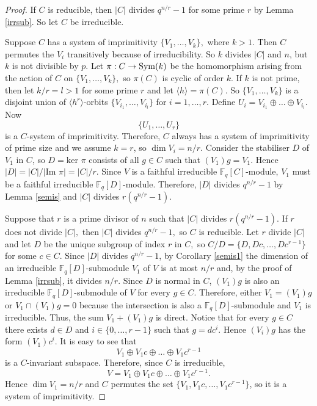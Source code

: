 \begin{proof}
If $C$ is reducible, then $|C|$ divides $q^{n/r}-1$ for some prime $r$ by Lemma \ref{irrsub}. So let $C$ be irreducible.

Suppose $C$ has a system of imprimitivity $\{V_1, \ldots, V_k\},$ where $k>1.$ Then $C$ permutes the $V_i$ transitively because of irreducibility. So $k$ divides $|C|$ and $n$, but $k$ is not divisible by $p$. Let $\pi: C \to \mathrm{Sym}(k)$ be the homomorphism arising from the action of $C$ on  
$\{V_1, \ldots, V_k\},$ so $\pi(C)$ is cyclic of order $k.$ If $k$ is not prime, then let $k/r=l>1$ for some prime $r$ and let $\langle h \rangle=\pi(C).$ So $\{V_1, \ldots, V_k\}$ is a disjoint union of  $\langle h^r \rangle$-orbits $\{V_{i_1}, \ldots, V_{i_l}\}$ for $i=1, \ldots, r.$ Define $U_i=V_{i_1} \oplus \ldots \oplus V_{i_l}.$ Now
$$\{U_1, \ldots, U_r\}$$ is a $C$-system of imprimitivity. Therefore, $C$ always has a system of imprimitivity of prime size and we assume $k=r$, so $\dim V_i =n/r$. Consider the stabiliser $D$ of $V_1$ in $C$, so $D=\text{ker }\pi$  consists of all $g \in C$ such that $(V_1)g=V_1.$ Hence $|D|=|C|/|\text{Im }\pi|=|C|/r.$ Since $V$ is a faithful irreducible $\mathbb{F}_q[C]$-module, $V_1$ must be a faithful irreducible $\mathbb{F}_q[D]$-module. Therefore, $|D|$ divides $q^{n/r}-1$ by Lemma \ref{semis} and $|C|$ divides $r(q^{n/r}-1).$

Suppose  that  $r$ is a prime divisor of $n$ such that $|C|$ divides ${r(q^{n/r}-1)}.$ If $r$ does not divide $|C|,$ then $|C|$ divides $q^{n/r}-1,$ so $C$ is reducible. Let $r$ divide $|C|$ and let $D$ be the unique subgroup of index $r$ in $C,$ so $C/D=\{D,Dc, \ldots, Dc^{r-1}\}$ for some  $c \in C.$ Since $|D|$ divides $q^{n/r}-1$, by Corollary \ref{semis1} the dimension of an irreducible $\mathbb{F}_q[D]$-submodule $V_1$ of $V$ is at most $n/r$ and, by the proof of Lemma \ref{irrsub}, it divides $n/r.$
Since $D$ is normal in $C$, $(V_1)g$ is also an irreducible $\mathbb{F}_q[D]$-submodule of $V$ for every $g \in C$. Therefore, either $V_1=(V_1)g$ or $V_1 \cap (V_1)g=0$ because the intersection is also a $\mathbb{F}_q[D]$-submodule and $V_1$ is irreducible. Thus, the sum $V_1 + (V_1)g$ is direct. Notice that for every $g \in C$ there exists $d \in D$ and $i \in \{0, \ldots, r-1\}$ such that  $g = dc^i.$ Hence $(V_i)g$ has the form $(V_1)c^i.$  It is easy to see that $$V_1 \oplus V_1c \oplus \ldots \oplus V_1c^{r-1} $$
is a $C$-invariant subspace. Therefore, since $C$ is irreducible, 
$$V=V_1 \oplus V_1c \oplus \ldots \oplus V_1c^{r-1}.$$
Hence $\dim V_1 = n/r$ and $C$ permutes the set $\{V_1, V_1c, \ldots,V_1c^{r-1}\}$, so it is a system of imprimitivity. 
\end{proof}
 

